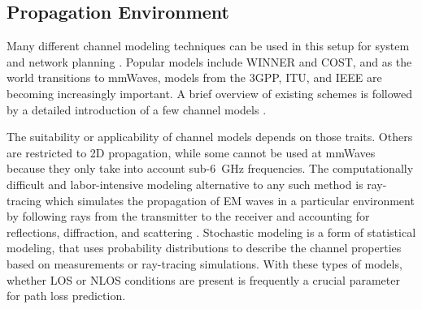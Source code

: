 \subsection{Propagation Environment} \label{Propagation Environment}
Many different channel modeling techniques can be used in this setup for system and network planning \cite{KabulUni, 3GPP17}. Popular models include WINNER and COST, and as the world transitions to \ac{mmWave}s, models from the \ac{3GPP}, \ac{ITU}, and IEEE are becoming increasingly important. A brief overview of existing schemes is followed by a detailed introduction of a few channel models \cite{diakhate2019propagation}.

The suitability or applicability of channel models depends on those traits. Others are restricted to 2D propagation, while some cannot be used at \ac{mmWave}s because they only take into account sub-\SI{6}{\giga\hertz} frequencies. The computationally difficult and labor-intensive modeling alternative to any such method is ray-tracing which simulates the propagation of EM waves in a particular environment \cite{rappaport2015millimeter,sun2018propagation} by following rays from the transmitter to the receiver and accounting for reflections, diffraction, and scattering \cite{pen}. Stochastic modeling is a form of statistical modeling, that uses probability distributions to describe the channel properties based on measurements or ray-tracing simulations. With these types of models, whether \ac{LOS} or \ac{NLOS} conditions are present is frequently a crucial parameter for path loss prediction.

